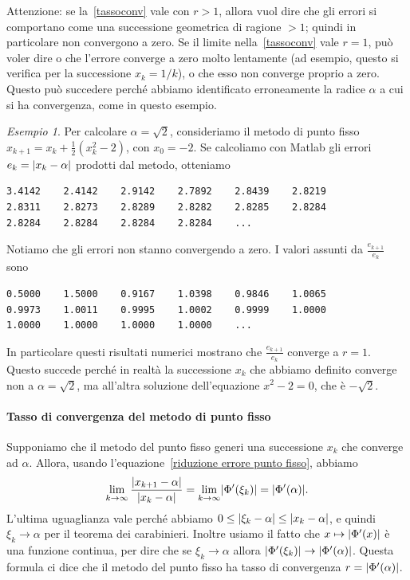 \documentclass[a4paper]{report}
\DeclarePairedDelimiter{\abs}{\lvert}{\rvert}
\theoremstyle{definition}
\theoremstyle{remark}
\newtheorem{esempio}[theorem]{Esempio}
\begin{document}
\marginpar{\dbend} Attenzione: se la~\eqref{tassoconv} vale con $r>1$, allora vuol dire che gli errori si comportano come una successione geometrica di ragione $>1$; quindi in particolare non convergono a zero. Se il limite nella~\eqref{tassoconv} vale $r=1$, può voler dire o che l'errore converge a zero molto lentamente (ad esempio, questo si verifica per la successione $x_k = 1/k$), o che esso non converge proprio a zero. Questo può succedere perché abbiamo identificato erroneamente la radice $\alpha$ a cui si ha convergenza, come in questo esempio.
\begin{esempio}
    Per calcolare $\alpha = \sqrt{2}$, consideriamo il metodo di punto fisso $x_{k+1} = x_k + \frac{1}{2} (x_k^2-2)$, con $x_0 = -2$. Se calcoliamo con Matlab gli errori $e_k = \abs{x_k - \alpha}$ prodotti dal metodo, otteniamo
    \begin{lstlisting}
3.4142    2.4142    2.9142    2.7892    2.8439    2.8219    
2.8311    2.8273    2.8289    2.8282    2.8285    2.8284
2.8284    2.8284    2.8284    2.8284    ...
    \end{lstlisting}
    Notiamo che gli errori non stanno convergendo a zero. I valori assunti da $\frac{e_{k+1}}{e_k}$ sono
\begin{lstlisting}
0.5000    1.5000    0.9167    1.0398    0.9846    1.0065    
0.9973    1.0011    0.9995    1.0002    0.9999    1.0000
1.0000    1.0000    1.0000    1.0000    ...
\end{lstlisting}
In particolare questi risultati numerici mostrano che $\frac{e_{k+1}}{e_k}$ converge a $r=1$. Questo succede perché in realtà la successione $x_k$ che abbiamo definito converge non a $\alpha = \sqrt{2}$, ma all'altra soluzione dell'equazione $x^2-2=0$, che è $-\sqrt{2}$.
\end{esempio}

\paragraph{Tasso di convergenza del metodo di punto fisso} Supponiamo che il metodo del punto fisso generi una successione $x_k$ che converge ad $\alpha$. Allora, usando l'equazione~\eqref{riduzione errore punto fisso}, abbiamo
\[
\lim_{k \to \infty} \frac{\abs{x_{k+1} - \alpha}}{\abs{x_k - \alpha}} = \lim_{k\to\infty} \abs{\Phi'(\xi_k)} = \abs{\Phi'(\alpha)}.
\]
L'ultima uguaglianza vale perché abbiamo $0 \leq \abs{\xi_k - \alpha} \leq \abs{x_k - \alpha}$, e quindi $\xi_k \to \alpha$ per il teorema dei carabinieri. Inoltre usiamo il fatto che $x \mapsto \abs{\Phi'(x)}$ è una funzione continua, per dire che se $\xi_k\to\alpha$ allora $\abs{\Phi'(\xi_k)} \to \abs{\Phi'(\alpha)}$. Questa formula ci dice che il metodo del punto fisso ha tasso di convergenza $r = \abs{\Phi'(\alpha)}$.
\end{document}
